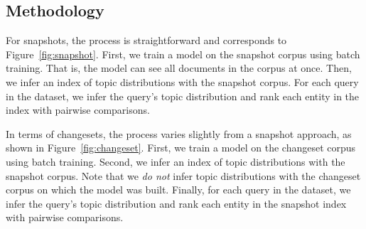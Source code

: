 
\subsection{Methodology}
\label{sec:methodology}

For snapshots, the process is straightforward and corresponds to
Figure~\ref{fig:snapshot}. First, we train a model on the snapshot corpus using
batch training. That is, the model can see all documents in the corpus at once.
Then, we infer an index of topic distributions with the snapshot corpus. For
each query in the dataset, we infer the query's topic distribution and rank each
entity in the index with pairwise comparisons.

In terms of changesets, the process varies slightly from a snapshot approach, as
shown in Figure~\ref{fig:changeset}.  First, we train a model on the changeset
corpus using batch training.  Second, we infer an index of topic distributions
with the snapshot corpus.  Note that we \emph{do not} infer topic distributions
with the changeset corpus on which the model was built.  Finally, for each query
in the dataset, we infer the query's topic distribution and rank each entity in
the snapshot index with pairwise comparisons.

